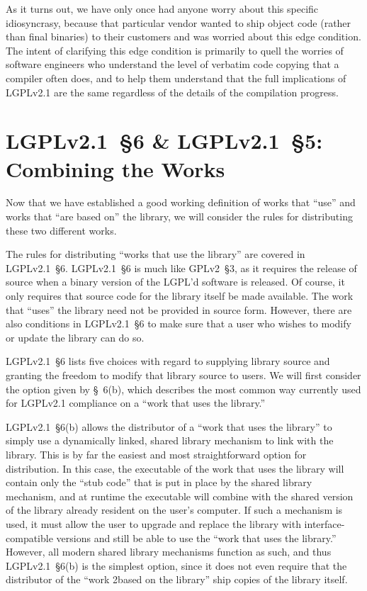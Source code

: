 As it turns out, we have only once had anyone worry about this specific
idiosyncrasy, because that particular vendor wanted to ship object code
(rather than final binaries) to their customers and was worried about
this edge condition. The intent of clarifying this edge condition is
primarily to quell the worries of software engineers who understand the
level of verbatim code copying that a compiler often does, and to help
them understand that the full implications of LGPLv2.1 are the same regardless
of the details of the compilation progress.

\section{LGPLv2.1~\S6 \& LGPLv2.1~\S5: Combining the Works}
\label{lgpl-section-6}
Now that we have established a good working definition of works that
``use'' and works that ``are based on'' the library, we will consider the
rules for distributing these two different works.

The rules for distributing ``works that use the library'' are covered in
LGPLv2.1~\S6\@. LGPLv2.1~\S6 is much like GPLv2~\S3, as it requires the release
of source when a binary version of the LGPL'd software is released. Of
course, it only requires that source code for the library itself be made
available. The work that ``uses'' the library need not be provided in
source form. However, there are also conditions in LGPLv2.1~\S6 to make sure
that a user who wishes to modify or update the library can do so.

LGPLv2.1~\S6 lists five choices with regard to supplying library source
and granting the freedom to modify that library source to users. We
will first consider the option given by \S~6(b), which describes the
most common way currently used for LGPLv2.1 compliance on a ``work that
uses the library.''

LGPLv2.1~\S6(b) allows the distributor of a ``work that uses the library'' to
simply use a dynamically linked, shared library mechanism to link with the
library. This is by far the easiest and most straightforward option for
distribution. In this case, the executable of the work that uses the
library will contain only the ``stub code'' that is put in place by the
shared library mechanism, and at runtime the executable will combine with
the shared version of the library already resident on the user's computer.
If such a mechanism is used, it must allow the user to upgrade and
replace the library with interface-compatible versions and still be able
to use the ``work that uses the library.''  However, all modern shared
library mechanisms function as such, and thus LGPLv2.1~\S6(b) is the simplest
option, since it does not even require that the distributor of the ``work
2based on the library'' ship copies of the library itself.


